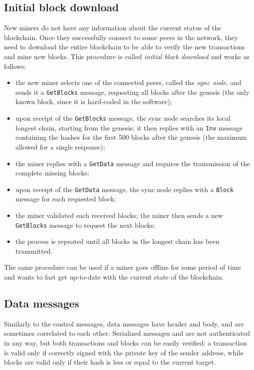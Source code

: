 \subsection{Initial block download}
New miners do not have any information about the current status of the blockchain.
Once they successfully connect to some peers in the network, they need to download the entire blockchain to be able to verify the new transactions and mine new blocks.
This procedure is called \textit{initial block download} and works as follows:
\begin{itemize}
	\item the new miner selects one of the connected peers, called the \textit{sync node}, and sends it a \texttt{GetBlocks} message, requesting all blocks after the genesis (the only known block, since it is hard-coded in the software);
	\item upon receipt of the \texttt{GetBlocks} message, the sync node searches its local longest chain, starting from the genesis; it then replies with an \texttt{Inv} message containing the hashes for the first \num{500} blocks after the genesis (the maximum allowed for a single response);
	\item the miner replies with a \texttt{GetData} message and requires the transmission of the complete missing blocks;
	\item upon receipt of the \texttt{GetData} message, the sync node replies with a \texttt{Block} message for each requested block;
	\item the miner validated each received blocks; the miner then sends a new \texttt{GetBlocks} message to request the next blocks;
	\item the process is repeated until all blocks in the longest chain has been transmitted.
\end{itemize}
The same procedure can be used if a miner goes offline for some period of time and wants to fast get up-to-date with the current state of the blockchain.

\subsection{Data messages}
Similarly to the control messages, data messages have header and body, and are sometimes correlated to each other.
Serialized messages and are not authenticated in any way, but both transactions and blocks can be easily verified:
a transaction is valid only if correctly signed with the private key of the sender address, while blocks are valid only if their hash is less or equal to the current target.

